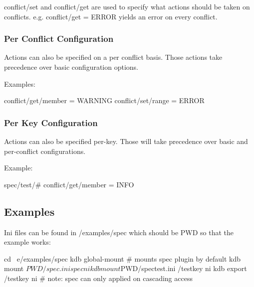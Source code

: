 {\ttfamily conflict/set} and {\ttfamily conflict/get} are used to specify what actions should be taken on conflicts. e.\+g. {\ttfamily conflict/get = E\+R\+R\+O\+R} yields an error on every conflict.

\subsubsection*{Per Conflict Configuration}

Actions can also be specified on a per conflict basis. Those actions take precedence over basic configuration options.

Examples\+: \begin{DoxyVerb}conflict/get/member = WARNING
conflict/set/range = ERROR
\end{DoxyVerb}


\subsubsection*{Per Key Configuration}

Actions can also be specified per-\/key. Those will take precedence over basic and per-\/conflict configurations.

Example\+: \begin{DoxyVerb}spec/test/#
    conflict/get/member = INFO
\end{DoxyVerb}


\subsection*{Examples}

Ini files can be found in /examples/spec which should be P\+W\+D so that the example works\+: \begin{DoxyVerb}cd ~e/examples/spec
kdb global-mount        # mounts spec plugin by default
kdb mount $PWD/spec.ini spec ni
kdb mount $PWD/spectest.ini /testkey ni
kdb export /testkey ni     # note: spec can only applied on cascading access
\end{DoxyVerb}


